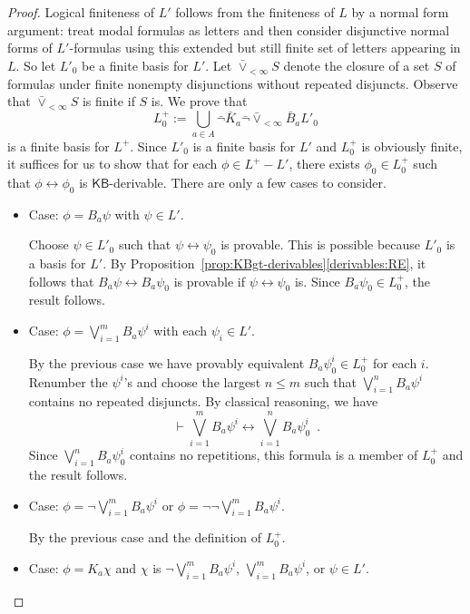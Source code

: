 \documentclass[12pt]{article}
\theoremstyle{definition}
\newcommand{\KB}{{\mathsf{KB}}}                        %
\begin{document}
\begin{proof}
  Logical finiteness of $L'$ follows from the finiteness of $L$ by a
  normal form argument: treat modal formulas as letters and then
  consider disjunctive normal forms of $L'$-formulas using this
  extended but still finite set of letters appearing in $L$.  So let
  $L'_0$ be a finite basis for $L'$.  Let ${\bar\vee}_{<\infty}S$
  denote the closure of a set $S$ of formulas under finite nonempty
  disjunctions without repeated disjuncts.  Observe that
  ${\bar\vee}_{<\infty}S$ is finite if $S$ is.  We prove that
  \[
  \textstyle
  L^+_0 := \bigcup_{a\in A}\bar\lnot\bar K_a\bar\lnot{\bar\vee}_{<\infty}\bar B_a L'_0
  \]
  is a finite basis for $L^+$.  Since $L'_0$ is a finite basis for
  $L'$ and $L^+_0$ is obviously finite, it suffices for us to show
  that for each $\phi\in L^+-L'$, there exists $\phi_0\in L^+_0$ such
  that $\phi\leftrightarrow\phi_0$ is $\KB$-derivable.  There are only
  a few cases to consider.
  \begin{itemize}
  \item Case: $\phi=B_a\psi$ with $\psi\in L'$.
    
    Choose $\psi\in L'_0$ such that $\psi\leftrightarrow\psi_0$ is
    provable.  This is possible because $L'_0$ is a basis for $L'$.
    By Proposition~\ref{prop:KBgt-derivables}\eqref{derivables:RE}, it
    follows that $B_a\psi\leftrightarrow B_a\psi_0$ is provable if
    $\psi\leftrightarrow\psi_0$ is.  Since $B_a\psi_0\in L^+_0$, the
    result follows.

  \item Case: $\phi=\bigvee_{i=1}^m B_a\psi^i$ with each $\psi_i\in L'$.

    By the previous case we have provably equivalent $B_a\psi^i_0\in
    L^+_0$ for each $i$.  Renumber the $\psi^i$'s and choose the
    largest $n\leq m$ such that $\bigvee_{i=1}^n B_a\psi^i$ contains
    no repeated disjuncts.  By classical reasoning, we have
    \[
    \textstyle
    \vdash\bigvee_{i=1}^m B_a\psi^i\leftrightarrow\bigvee_{i=1}^n B_a\psi^i_0\enspace.
    \]
    Since $\bigvee_{i=1}^n B_a\psi^i_0$ contains no repetitions, this
    formula is a member of $L^+_0$ and the result follows.

  \item Case: $\phi=\lnot\bigvee_{i=1}^m B_a\psi^i$ or 
    $\phi=\lnot\lnot\bigvee_{i=1}^m B_a\psi^i$.

    By the previous case and the definition of $L^+_0$.

  \item Case: $\phi=K_a\chi$ and $\chi$ is $\lnot\bigvee_{i=1}^m B_a\psi^i$, 
    $\bigvee_{i=1}^m B_a\psi^i$, or $\psi\in L'$.


\end{itemize}
\end{proof}
\end{document}
